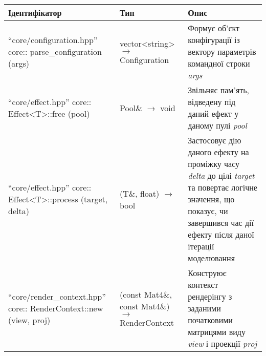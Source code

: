 \small\begin{longtable}{| C{6cm} | C{4cm} | C{5cm} |}
  \hline
  Ідентифікатор & Тип & Опис \\

  \hline
  ``core/configuration.hpp'' \newline core:: \newline parse_configuration \newline (args)
  & vector<string> $\to$ Configuration
  & Формує об'єкт конфігурації із вектору параметрів командної строки \emph{args} \\
  \hline
  ``core/effect.hpp'' \newline core:: \newline Effect<T>::free \newline (pool)
  & Pool\& $\to$ void
  & Звільняє пам'ять, відведену під даний ефект у даному пулі \emph{pool} \\
  \hline
  ``core/effect.hpp'' \newline core:: \newline Effect<T>::process \newline (target, delta)
  & (T\&, float) $\to$ bool
  & Застосовує дію даного ефекту на проміжку часу \emph{delta}
  до цілі \emph{target} та повертає логічне значення, що показує,
  чи завершився час дії ефекту після даної ітерації моделювання \\
  \hline
  ``core/render_context.hpp'' \newline core:: \newline
  RenderContext::new \newline (view, proj)
  & (const Mat4\&, const Mat4\&) $\to$ RenderContext
  & Конструює контекст рендерінгу з заданими початковими
  матрицями виду \emph{view} і проекції \emph{proj} \\


\end{longtable}
